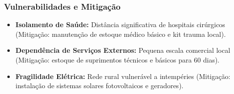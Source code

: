 \subsubsection{Vulnerabilidades e
Mitigação}

\begin{itemize}
\tightlist
\item
  \textbf{Isolamento de Saúde:} Distância significativa de hospitais
  cirúrgicos (Mitigação: manutenção de estoque médico básico e kit
  trauma local).
\item
  \textbf{Dependência de Serviços Externos:} Pequena escala comercial
  local (Mitigação: estoque de suprimentos técnicos e básicos para 60
  dias).
\item
  \textbf{Fragilidade Elétrica:} Rede rural vulnerável a intempéries
  (Mitigação: instalação de sistemas solares fotovoltaicos e geradores).
\end{itemize}

